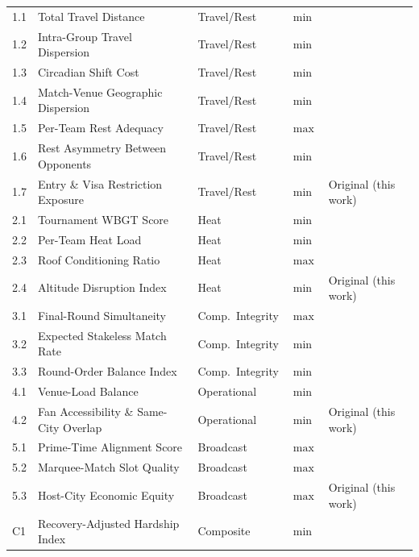 \documentclass[12pt, letterpaper]{article}
\begin{document}
\begin{longtable}{@{}p{0.9cm} p{4.6cm} p{2.8cm} p{1.2cm} p{4.0cm}@{}}
1.1 & Total Travel Distance & Travel/Rest & $\min$ &
      \citet{Easton2001} \\[2pt]
1.2 & Intra-Group Travel Dispersion & Travel/Rest & $\min$ &
      \citet{GuajardoEtAl2026} \\[2pt]
1.3 & Circadian Shift Cost & Travel/Rest & $\min$ &
      \citet{Recht1995} \\[2pt]
1.4 & Match-Venue Geographic Dispersion & Travel/Rest & $\min$ &
      \citet{MikamiTravel2026} \\[2pt]
1.5 & Per-Team Rest Adequacy & Travel/Rest & $\max$ &
      \citet{AtanCavdaroglu2018} \\[2pt]
1.6 & Rest Asymmetry Between Opponents & Travel/Rest & $\min$ &
      \citet{AtanCavdaroglu2018} \\[2pt]
1.7 & Entry \& Visa Restriction Exposure & Travel/Rest & $\min$ &
      Original (this work) \\
\midrule
2.1 & Tournament WBGT Score & Heat & $\min$ &
      \citet{Liljegren2008} \\[2pt]
2.2 & Per-Team Heat Load & Heat & $\min$ &
      \citet{FIFPRO2025} \\[2pt]
2.3 & Roof Conditioning Ratio & Heat & $\max$ &
      \citet{FIFPRO2025} \\[2pt]
2.4 & Altitude Disruption Index & Heat & $\min$ &
      Original (this work) \\
\midrule
3.1 & Final-Round Simultaneity & Comp.\ Integrity & $\max$ &
      \citet{Guyon2020} \\[2pt]
3.2 & Expected Stakeless Match Rate & Comp.\ Integrity & $\min$ &
      \citet{CsatoEtAl2024} \\[2pt]
3.3 & Round-Order Balance Index & Comp.\ Integrity & $\min$ &
      \citet{KrumerEtAl2017} \\
\midrule
4.1 & Venue-Load Balance & Operational & $\min$ &
      \citet{RibeiroUrrutia2007} \\[2pt]
4.2 & Fan Accessibility \& Same-City Overlap & Operational & $\min$ &
      Original (this work) \\
\midrule
5.1 & Prime-Time Alignment Score & Broadcast & $\max$ &
      \citet{RibeiroUrrutia2007} \\[2pt]
5.2 & Marquee-Match Slot Quality & Broadcast & $\max$ &
      \citet{RibeiroUrrutia2007} \\[2pt]
5.3 & Host-City Economic Equity & Broadcast & $\max$ &
      Original (this work) \\
\midrule
C1  & Recovery-Adjusted Hardship Index & Composite & $\min$ &

\end{longtable}
\end{document}
